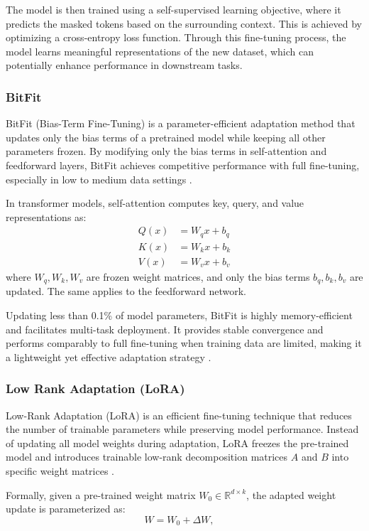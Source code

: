 \documentclass[11pt]{article}
\begin{document}
The model is then trained using a self-supervised learning objective, where it predicts the masked tokens based on the surrounding context. This is achieved by optimizing a cross-entropy loss function. Through this fine-tuning process, the model learns meaningful representations of the new dataset, which can potentially enhance performance in downstream tasks.
\subsubsection{BitFit}
\label{BitFit}
BitFit (Bias-Term Fine-Tuning) is a parameter-efficient adaptation method that updates only the bias terms of a pretrained model while keeping all other parameters frozen. By modifying only the bias terms in self-attention and feedforward layers, BitFit achieves competitive performance with full fine-tuning, especially in low to medium data settings \cite{ben-zaken-2021-bitfit}.

In transformer models, self-attention computes key, query, and value representations as:
\begin{align}  
Q(x) &= W_q x + b_q \\  
K(x) &= W_k x + b_k \\  
V(x) &= W_v x + b_v  
\end{align}  
where $W_q, W_k, W_v$ are frozen weight matrices, and only the bias terms $b_q, b_k, b_v$ are updated. The same applies to the feedforward network. 

Updating less than 0.1\% of model parameters, BitFit is highly memory-efficient and facilitates multi-task deployment. It provides stable convergence and performs comparably to full fine-tuning when training data are limited, making it a lightweight yet effective adaptation strategy \cite{ben-zaken-2021-bitfit}.



\subsubsection{Low Rank Adaptation (LoRA)}
    \label{LoRA}
Low-Rank Adaptation (LoRA) is an efficient fine-tuning technique that reduces the number of trainable parameters while preserving model performance. Instead of updating all model weights during adaptation, LoRA freezes the pre-trained model and introduces trainable low-rank decomposition matrices $A$ and $B$ into specific weight matrices \cite{hu2021lora}.

Formally, given a pre-trained weight matrix $W_0 \in \mathbb{R}^{d \times k}$, the adapted weight update is parameterized as:
\begin{equation}
    W = W_0 + \Delta W, \quad
\end{equation}
\end{document}
